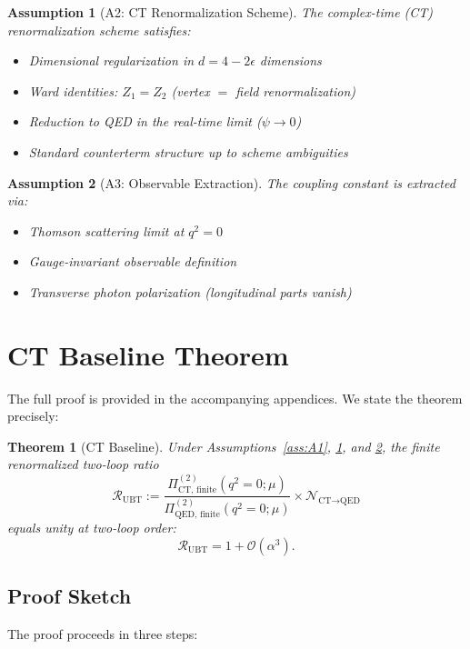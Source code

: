 \documentclass[11pt,a4paper]{article}
\newtheorem{theorem}{Theorem}
\newtheorem{assumption}{Assumption}
\begin{document}
\begin{assumption}[A2: CT Renormalization Scheme]
\label{ass:A2}
The complex-time (CT) renormalization scheme satisfies:
\begin{itemize}
\item Dimensional regularization in $d = 4 - 2\epsilon$ dimensions
\item Ward identities: $Z_1 = Z_2$ (vertex $=$ field renormalization)
\item Reduction to QED in the real-time limit ($\psi \to 0$)
\item Standard counterterm structure up to scheme ambiguities
\end{itemize}
\end{assumption}

\begin{assumption}[A3: Observable Extraction]
\label{ass:A3}
The coupling constant is extracted via:
\begin{itemize}
\item Thomson scattering limit at $q^2 = 0$
\item Gauge-invariant observable definition
\item Transverse photon polarization (longitudinal parts vanish)
\end{itemize}
\end{assumption}

\section{CT Baseline Theorem}

The full proof is provided in the accompanying appendices. We state the theorem precisely:

\begin{theorem}[CT Baseline]
\label{thm:ct-baseline}
Under Assumptions~\ref{ass:A1}, \ref{ass:A2}, and \ref{ass:A3}, the finite renormalized two-loop ratio
\[
\mathcal{R}_{\mathrm{UBT}} := \frac{\Pi^{(2)}_{\text{CT, finite}}(q^2=0;\mu)}{\Pi^{(2)}_{\text{QED, finite}}(q^2=0;\mu)} \times \mathcal{N}_{\text{CT}\to\text{QED}}
\]
equals unity at two-loop order:
\[
\mathcal{R}_{\mathrm{UBT}} = 1 + \mathcal{O}(\alpha^3).
\]
\end{theorem}

\subsection{Proof Sketch}

The proof proceeds in three steps:
\end{document}
